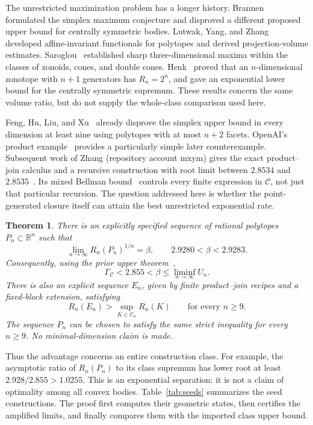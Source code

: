 \documentclass[11pt]{article}
\newtheorem{theorem}{Theorem}
\newcommand{\R}{\mathbb R}
\newcommand{\CC}{\mathcal C}
\begin{document}
The unrestricted maximization problem has a longer history.
Brannen~\cite{brannen} formulated the simplex maximum conjecture and
disproved a different proposed upper bound for centrally symmetric bodies.
Lutwak, Yang, and Zhang~\cite{lyz} developed affine-invariant functionals
for polytopes and derived projection-volume estimates. Saroglou~\cite{saroglou-cones}
established sharp three-dimensional maxima within the classes of zonoids,
cones, and double cones. Henk~\cite{henk} proved that an $n$-dimensional
zonotope with $n+1$ generators has $R_n=2^n$, and gave an exponential
lower bound for the centrally symmetric supremum.
These results concern the same volume ratio,
but do not supply the whole-class comparison used here.

Feng, Hu, Liu, and Xu~\cite{feng} already disprove the simplex upper bound
in every dimension at least nine using polytopes with at most $n+2$
facets. OpenAI's product example~\cite{openai} provides a particularly
simple later counterexample. Subsequent work of Zhang (repository account mxym)
gives the exact product--join calculus and a recursive construction with
root limit between $2.8534$ and $2.8535$~\cite[Section 9]{mxym-calculus}.
Its mixed Bellman bound~\cite{mxym-upper} controls every finite expression
in $\CC$, not just that particular recursion.
The question addressed here is whether the point-generated closure itself
can attain the best unrestricted exponential rate.

\begin{theorem}\label{thm:main}
There is an explicitly specified sequence of rational polytopes
$P_n\subset\R^n$ such that
\[
 \lim_{n\to\infty}R_n(P_n)^{1/n}=\beta,
 \qquad 2.9280<\beta<2.9283.
\]
Consequently, using the prior upper theorem~\cite{mxym-upper},
\[
 \Gamma_{\CC}<2.855<\beta
 \le\liminf_{n\to\infty}U_n.
\]
There is also an explicit sequence $E_n$, given by finite product--join
recipes and a fixed-block extension, satisfying
\[
 R_n(E_n)>\sup_{K\in\CC_n}R_n(K)\qquad\text{for every }n\ge9.
\]
The sequence $P_n$ can be chosen to satisfy the same strict inequality
for every $n\ge9$. No minimal-dimension claim is made.
\end{theorem}

Thus the advantage concerns an entire construction class. For example,
the asymptotic ratio of $R_n(P_n)$ to its class supremum has lower root
at least $2.928/2.855>1.0255$. This is an exponential separation;
it is not a claim of optimality among all convex bodies.
Table~\ref{tab:seeds} summarizes the seed constructions. The proof first
computes their geometric states, then certifies the amplified limits,
and finally compares them with the imported class upper bound.
\end{document}
